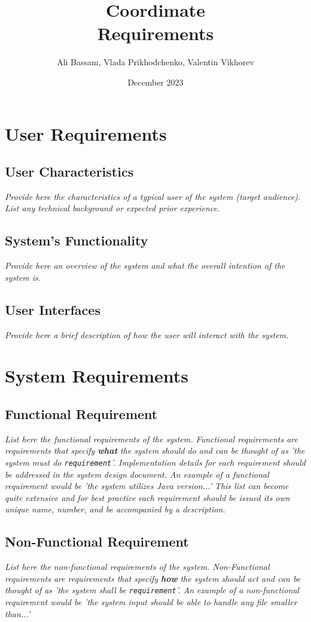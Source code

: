 \documentclass{article}
\title{Coordimate\\ Requirements}
\date{December 2023}
\author{Ali Bassam, Vlada Prikhodchenko, Valentin Vikhorev}
\begin{document}
\maketitle

\section{User Requirements}

\subsection{User Characteristics}

\textit{Provide here the characteristics of a typical user of the system (target
audience). List any technical background or expected prior experience. } 

\subsection{System's Functionality}

\textit{Provide here an overview of the system and what the overall intention of the
system is. }
      
\subsection{User Interfaces}

\textit{Provide here a brief description of how the user will interact with the
system.}


\section{System Requirements}

\subsection{Functional Requirement}

\textit{List here the functional requirements of the system. Functional requirements
are requirements that specify \textbf{what} the system should do and can be
thought of as 'the system must do \texttt{requirement}'. Implementation details
for each requirement should be addressed in the system design document. An
example of a functional requirement would be 'the system utilizes Java
version...' This list can become quite extensive and for best practice each
requirement should be issued its own unique name, number, and be accompanied by
a description.}

\subsection{Non-Functional Requirement}

\textit{List here the non-functional requirements of the system. Non-Functional
requirements are requirements that specify \textbf{how} the system should act
and can be thought of as 'the system shall be \texttt{requirement}'. An example
of a non-functional requirement would be 'the system input should be able to
handle any file smaller than...'}
\end{document}
